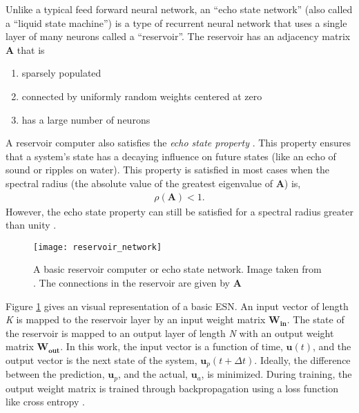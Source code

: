 Unlike a typical feed forward neural network, an ``echo state network'' (also
called a ``liquid state machine'') is a type of
recurrent neural network that uses a single layer of many neurons called a
``reservoir''. The reservoir has an adjacency matrix $\bm{A}$ that is
\begin{enumerate}
	\item sparsely populated
	\item connected by uniformly random weights centered at zero
	\item has a large number of neurons
\end{enumerate}
A reservoir computer also satisfies the \textit{echo state property}
\cite{pathak_model-free_2018, lukosevicius_reservoir_2009}. This
property ensures that a system's state has a decaying influence on future states
(like an echo of sound or ripples on water). This property is satisfied in most
cases when the spectral radius (the absolute value of the greatest eigenvalue of
$\bm{A}$)\cite{lukosevicius_reservoir_2009} is,
\begin{align}
	\rho(\bm{A}) < 1.
\end{align}
However, the echo state property can still be satisfied for a spectral radius
greater than unity \cite{lukosevicius_practical_2012}.

\begin{figure}[H]
	\texttt{[image: reservoir\_network]}
	\caption{A basic reservoir computer or echo state network. Image taken from
	\cite{chouikhi_genesis_2018}. The connections in the reservoir are given by
	$\bm{A}$}
	\label{fig:RCmodel}
\end{figure}

Figure \ref{fig:RCmodel} gives an visual representation of a basic
\acrshort{ESN}. An
input vector of length \textit{K} is mapped to the reservoir layer by an input
weight matrix $\bm{W_{in}}$. The state of the reservoir is mapped to an output
layer of length \textit{N} with an output weight matrix $\bm{W_{out}}$. In this
work, the input vector is a function of time, $\bm{u}(t)$, and the output
vector is the next state of the system, $\bm{u}_p(t+\Delta t)$. Ideally, the
difference between the prediction, $\bm{u}_p$, and the actual, $\bm{u}_a$, is
minimized. During training, the output weight matrix is trained through
backpropagation using a loss function like cross entropy
\cite{pathak_model-free_2018, vlachas_backpropagation_2020}.

